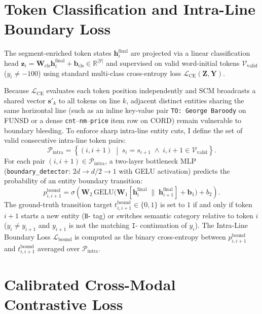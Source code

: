 \section{Token Classification and Intra-Line Boundary Loss}
\label{sec:method_boundary_loss}

The segment-enriched token states $\mathbf{h}_i^{\text{final}}$ are projected via a linear classification head $\mathbf{z}_i = \mathbf{W}_{\text{cls}}\mathbf{h}_i^{\text{final}} + \mathbf{b}_{\text{cls}} \in \mathbb{R}^{|\mathcal{Y}|}$ and supervised on valid word-initial tokens $\mathcal{V}_{\text{valid}}$ ($y_i \neq -100$) using standard multi-class cross-entropy loss $\mathcal{L}_{\text{CE}}(\mathbf{Z}, \mathbf{Y})$.

Because $\mathcal{L}_{\text{CE}}$ evaluates each token position independently and SCM broadcasts a shared vector $\mathbf{s}'_k$ to all tokens on line $k$, adjacent distinct entities sharing the same horizontal line (such as an inline key-value pair \texttt{TO: George Baroody} on FUNSD or a dense \texttt{cnt}--\texttt{nm}--\texttt{price} item row on CORD) remain vulnerable to boundary bleeding. To enforce sharp intra-line entity cuts, I define the set of valid consecutive intra-line token pairs:
\begin{equation}
    \mathcal{P}_{\text{intra}} = \left\{ (i, i+1) \;\middle|\; s_i = s_{i+1} \;\wedge\; i, i+1 \in \mathcal{V}_{\text{valid}} \right\}.
\end{equation}
For each pair $(i, i+1) \in \mathcal{P}_{\text{intra}}$, a two-layer bottleneck MLP (\texttt{boundary\_detector}: $2d \to d/2 \to 1$ with GELU activation) predicts the probability of an entity boundary transition:
\begin{equation}
    p_{i, i+1}^{\text{bound}} = \sigma\!\left(\mathbf{W}_2 \, \text{GELU}\big(\mathbf{W}_1 [\mathbf{h}_i^{\text{final}} \;\|\; \mathbf{h}_{i+1}^{\text{final}}] + \mathbf{b}_1\big) + b_2\right).
\end{equation}
The ground-truth transition target $t_{i, i+1}^{\text{bound}} \in \{0, 1\}$ is set to $1$ if and only if token $i+1$ starts a new entity ($\texttt{B-}$ tag) or switches semantic category relative to token $i$ ($y_i \neq y_{i+1}$ and $y_{i+1}$ is not the matching $\texttt{I-}$ continuation of $y_i$). The Intra-Line Boundary Loss $\mathcal{L}_{\text{bound}}$ is computed as the binary cross-entropy between $p_{i, i+1}^{\text{bound}}$ and $t_{i, i+1}^{\text{bound}}$ averaged over $\mathcal{P}_{\text{intra}}$.

\section{Calibrated Cross-Modal Contrastive Loss}
\label{sec:method_contrastive_loss}

